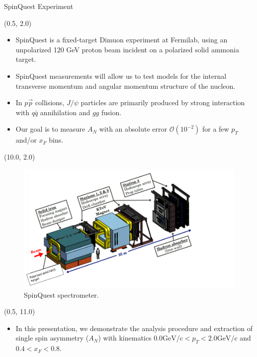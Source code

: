 \documentclass[10pt, xcolor={dvipsnames}, aspectratio = 169]{beamer}
\newcommand{\citeme}[1]{{\tiny \footfullcite{#1}}}
\newcommand{\jpsi}{$J/\psi$ }
\newcommand{\pp}{$p\vec{p}$ }
\begin{document}
\begin{frame}{SpinQuest Experiment}

\begin{textblock}{9.0}(0.5, 2.0)

\begin{itemize}

\item SpinQuest is a fixed-target Dimuon experiment at Fermilab, using an unpolarized 120 GeV proton beam incident on a
polarized solid ammonia target.

\item SpinQuest measurements will allow us to test models for the internal transverse momentum and angular momentum
structure of the nucleon.

\item In \pp collisions, \jpsi particles are primarily produced by strong interaction with $q\bar{q}$ annihilation and $gg$ fusion.

\item Our goal is to measure $A_{N}$ with an absolute error $\mathcal{O}(10^{-2})$ for a few $p_{T}$ and/or $x_{F}$ bins.

\end{itemize}

\end{textblock}


\begin{textblock}{7.0}(10.0, 2.0)

\begin{figure}
    \centering
    \includegraphics[width = 7.0 cm]{imgs/spectrometer.png}
    \caption{SpinQuest spectrometer. \citeme{SeaQuest:2019hsx}}
\end{figure}
\end{textblock}

\begin{textblock}{14.0}(0.5, 11.0)
\begin{itemize}
    \item In this presentation, we demonstrate the analysis procedure and  extraction of single spin asymmetry ($A_{N}$) with kinematics $0.0 \text{GeV/c}< p_{T} < 2.0 \text{GeV/c}$ and $0.4 < x_{F} < 0.8$.
\end{itemize}
\end{textblock}

\end{frame}
\end{document}
